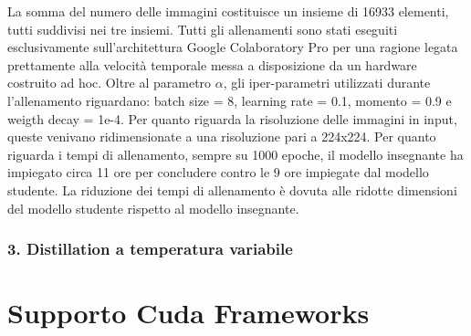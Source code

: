 La somma del numero delle immagini costituisce un insieme di 16933 elementi, tutti suddivisi nei tre insiemi. Tutti gli allenamenti sono stati eseguiti esclusivamente sull'architettura Google Colaboratory Pro per una ragione legata prettamente alla velocità temporale messa a disposizione da un hardware costruito ad hoc. Oltre al parametro $\alpha$, gli iper-parametri utilizzati durante l'allenamento riguardano: batch size = 8, learning rate = 0.1, momento = 0.9 e weigth decay = 1e-4. Per quanto riguarda la risoluzione delle immagini in input, queste venivano ridimensionate a una risoluzione pari a 224x224. Per quanto riguarda i tempi di allenamento, sempre su 1000 epoche, il modello insegnante ha impiegato circa 11 ore per concludere contro le 9 ore impiegate dal modello studente. La riduzione dei tempi di allenamento è dovuta alle ridotte dimensioni del modello studente rispetto al modello insegnante. 

\subsubsection{3. Distillation a temperatura variabile}

\section{Supporto Cuda Frameworks}
